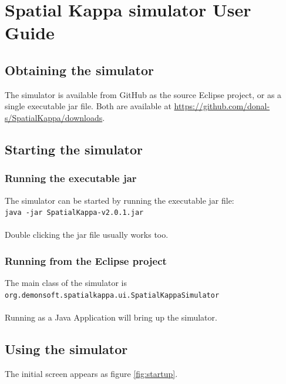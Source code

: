\chapter{Spatial Kappa simulator User Guide}

\section{Obtaining the simulator}

The simulator is available from GitHub as the source Eclipse project, or as a single executable jar file. Both are available at \url{https://github.com/donal-s/SpatialKappa/downloads}. 

\section{Starting the simulator}

\subsection{Running the executable jar}

The simulator can be started by running the executable jar file:\\
\verb|java -jar SpatialKappa-v2.0.1.jar|\\\\
Double clicking the jar file usually works too.

\subsection{Running from the Eclipse project}

The main class of the simulator is \\
\verb|org.demonsoft.spatialkappa.ui.SpatialKappaSimulator|\\\\
Running as a Java Application will bring up the simulator.


\section{Using the simulator}

The initial screen appears as figure \ref{fig:startup}.

